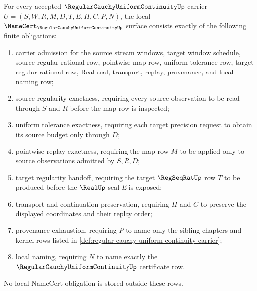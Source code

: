 \begin{theorem}
\label{thm:regular-cauchy-uniform-continuity-namecert-obligations}
For every accepted $\RegularCauchyUniformContinuityUp$ carrier $U=(S,W,R,M,D,T,E,H,C,P,N)$, the local $\NameCert_{\RegularCauchyUniformContinuityUp}$ surface consists exactly of the following finite obligations:
\begin{enumerate}
\item carrier admission for the source stream windows, target window schedule, source regular-rational row, pointwise map row, uniform tolerance row, target regular-rational row, Real seal, transport, replay, provenance, and local naming row;
\item source regularity exactness, requiring every source observation to be read through $S$ and $R$ before the map row is inspected;
\item uniform tolerance exactness, requiring each target precision request to obtain its source budget only through $D$;
\item pointwise replay exactness, requiring the map row $M$ to be applied only to source observations admitted by $S,R,D$;
\item target regularity handoff, requiring the target $\RegSeqRatUp$ row $T$ to be produced before the $\RealUp$ seal $E$ is exposed;
\item transport and continuation preservation, requiring $H$ and $C$ to preserve the displayed coordinates and their replay order;
\item provenance exhaustion, requiring $P$ to name only the sibling chapters and kernel rows listed in \autoref{def:regular-cauchy-uniform-continuity-carrier};
\item local naming, requiring $N$ to name exactly the $\RegularCauchyUniformContinuityUp$ certificate row.
\end{enumerate}
No local NameCert obligation is stored outside these rows.
\end{theorem}
